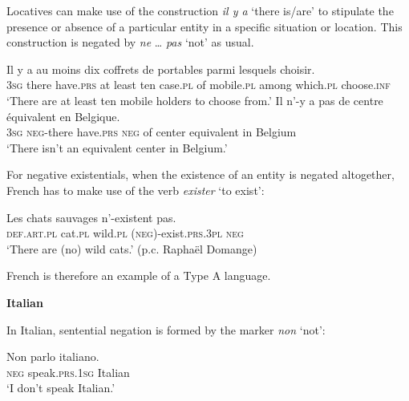 ﻿\documentclass[output=paper]{langsci/langscibook}
\begin{document}
\begin{unindented}
Locatives can make use of the construction \textit{il y a} `there is\slash are' to stipulate the presence or absence of a particular entity in a specific situation or location. This construction is negated by \textit{ne} … \textit{pas} `not' as usual.
%
\begin{exe}\ex \gll
Il y a au moins dix coffrets de portables parmi lesquels choisir. \\
\textsc{3sg} there have.\textsc{prs} at  least    ten case.\textsc{pl} of mobile.\textsc{pl} among which.\textsc{pl} choose.\textsc{inf} \\
    \glt `There are at least ten mobile holders to choose from.' \citep[274]{Offord2006}
\ex \gll Il n’-y a pas de centre équivalent en Belgique. \\
\textsc{3sg} \textsc{neg}-there have.\textsc{prs} \textsc{neg}  of center equivalent in Belgium \\
    \glt `There isn't an equivalent center in Belgium.' \citep[208]{Offord2006}
    \end{exe}

For negative existentials, when the existence of an entity is negated altogether, French has to make use of the verb \textit{exister} `to exist':
%
\begin{exe}\ex \gll Les chats sauvages {\op}n’-{\cp}existent pas. \\
\textsc{def.art.pl} cat.\textsc{pl} wild.\textsc{pl}   (\textsc{neg})-exist.\textsc{prs.3pl} \textsc{neg} \\
    \glt `There are (no) wild cats.' (p.c. Raphaël Domange)
    \end{exe}

French is therefore an example of a Type A language. 

\textbf{Italian}

In Italian, sentential negation is formed by the marker \textit{non} `not':
%
\begin{exe}\ex \gll Non parlo italiano. \\
\textsc{neg} speak.\textsc{prs}.\textsc{1sg} Italian  \\
    \glt `I don't speak Italian.' \parencite[41]{PeyronelHiggins2006}
    \end{exe}


\end{unindented}
\end{document}
